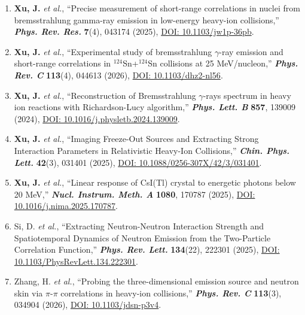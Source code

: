 \documentclass[11pt]{article}
\begin{document}
\begin{enumerate}[leftmargin=1.7em,itemsep=0.78em,topsep=0pt]
  \item \textbf{Xu, J.} \textit{et al.}, ``Precise measurement of short-range correlations in nuclei from bremsstrahlung gamma-ray emission in low-energy heavy-ion collisions,'' \textbf{\textit{Phys. Rev. Res.}} \textbf{7}(4), 043174 (2025), \href{https://doi.org/10.1103/jw1p-36pb}{DOI: 10.1103/jw1p-36pb}.

  \item \textbf{Xu, J.} \textit{et al.}, ``Experimental study of bremsstrahlung $\gamma$-ray emission and short-range correlations in ${}^{124}$Sn+${}^{124}$Sn collisions at 25 MeV/nucleon,'' \textbf{\textit{Phys. Rev. C}} \textbf{113}(4), 044613 (2026), \href{https://doi.org/10.1103/dhz2-nl56}{DOI: 10.1103/dhz2-nl56}.

  \item \textbf{Xu, J.} \textit{et al.}, ``Reconstruction of Bremsstrahlung $\gamma$-rays spectrum in heavy ion reactions with Richardson-Lucy algorithm,'' \textbf{\textit{Phys. Lett. B}} \textbf{857}, 139009 (2024), \href{https://doi.org/10.1016/j.physletb.2024.139009}{DOI: 10.1016/j.physletb.2024.139009}.

  \item \textbf{Xu, J.} \textit{et al.}, ``Imaging Freeze-Out Sources and Extracting Strong Interaction Parameters in Relativistic Heavy-Ion Collisions,'' \textbf{\textit{Chin. Phys. Lett.}} \textbf{42}(3), 031401 (2025), \href{https://doi.org/10.1088/0256-307X/42/3/031401}{DOI: 10.1088/0256-307X/42/3/031401}.

  \item \textbf{Xu, J.} \textit{et al.}, ``Linear response of CsI(Tl) crystal to energetic photons below 20 MeV,'' \textbf{\textit{Nucl. Instrum. Meth. A}} \textbf{1080}, 170787 (2025), \href{https://doi.org/10.1016/j.nima.2025.170787}{DOI: 10.1016/j.nima.2025.170787}.

  \item Si, D. \textit{et al.}, ``Extracting Neutron-Neutron Interaction Strength and Spatiotemporal Dynamics of Neutron Emission from the Two-Particle Correlation Function,'' \textbf{\textit{Phys. Rev. Lett.}} \textbf{134}(22), 222301 (2025), \href{https://doi.org/10.1103/PhysRevLett.134.222301}{DOI: 10.1103/PhysRevLett.134.222301}.

  \item Zhang, H. \textit{et al.}, ``Probing the three-dimensional emission source and neutron skin via $\pi$-$\pi$ correlations in heavy-ion collisions,'' \textbf{\textit{Phys. Rev. C}} \textbf{113}(3), 034904 (2026), \href{https://doi.org/10.1103/jdsn-p3v4}{DOI: 10.1103/jdsn-p3v4}.


\end{enumerate}
\end{document}

